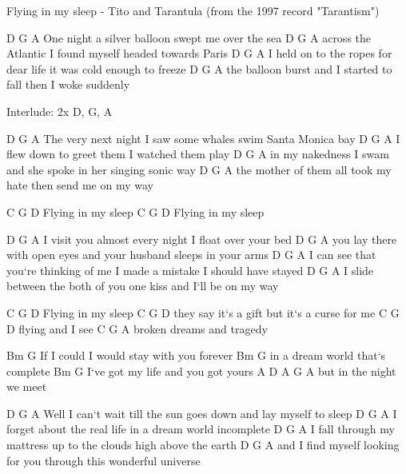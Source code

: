 
Flying in my sleep - Tito and Tarantula (from the 1997 record "Tarantism")


        D                     G                 A
   One night a silver balloon swept me over the sea
   D                                 G               A
   across the Atlantic I found myself headed towards Paris
      D                                        G              A
   I held on to the ropes for dear life it was cold enough to freeze
         D                                        G        A
   the balloon burst and I started to fall then I woke suddenly


Interlude: 2x D, G, A


       D                                 G                 A
   The very next night I saw some whales swim Santa Monica bay
  D                             G           A
   I flew down to greet them I watched them play
          D                                    G             A
   in my nakedness I swam and she spoke in her singing sonic way
          D                                 G             A
   the mother of them all took my hate then send me on my way


   C    G             D
   Flying in my sleep
   C    G             D
   Flying in my sleep

       D                         G                  A
   I visit you almost every night I float over your bed
 D                                       G                      A
   you lay there with open eyes and your husband sleeps in your arms
         D                                       G                     A
   I can see that you`re thinking of me I made a mistake I should have stayed
      D                                G                      A
   I slide between the both of you one kiss and I`ll be on my way

   C   G        D
   Flying in my sleep
        C              G                     D
   they say it`s a gift but it`s a curse for me
   C   G        D
   flying and I see
   C      G             A
   broken dreams and tragedy

Bm                     G
    If I could I would stay with you forever
Bm                          G
    in a dream world that`s complete
Bm                       G
    I`ve got my life and you got yours
A                       D A G A
    but in the night we meet


         D                                  G                  A
    Well I can`t wait till the sun goes down and lay myself to sleep
  D                                   G               A
    I forget about the real life in a dream world incomplete
       D                                        G                   A
    I fall through my mattress up to the clouds high above the earth
          D                                       G             A
    and I find myself looking for you through this wonderful universe

